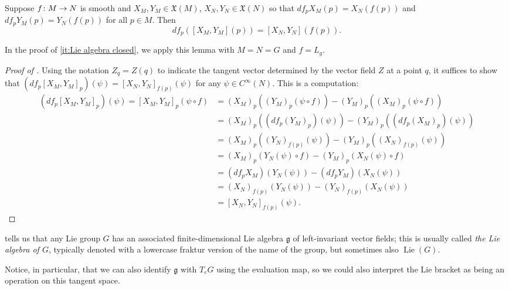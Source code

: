 \begin{lemma}\label{lem:differential of bracket}
	Suppose $f \colon\thinspace\! M \to N$ is smooth and $X_M, Y_M \in \mathfrak{X}(M)$, $X_N, Y_N \in \mathfrak{X}(N)$ so that $df_pX_M(p) = X_N(f(p))$ and $df_p Y_M(p) = Y_N(f(p))$ for all $p \in M$. Then
	\[
		df_p([X_M,Y_M](p)) = [X_N,Y_N](f(p)).
	\]
\end{lemma}

In the proof of  \ref{it:Lie algebra closed}, we apply this lemma with $M=N=G$ and $f = L_g$.

\begin{proof}[Proof of ]
	Using the notation $Z_q = Z(q)$ to indicate the tangent vector determined by the vector field $Z$ at a point $q$, it suffices to show that $\left(df_p[X_M,Y_M]_p\right)(\psi) = [X_N,Y_N]_{f(p)}(\psi)$ for any $\psi \in C^\infty(N)$. This is a computation:
	\begin{align*}
		\left(df_p[X_M,Y_M]_p\right)(\psi) = [X_M,Y_M]_p(\psi \circ f) & = (X_M)_p((Y_M)_p(\psi \circ f)) - (Y_M)_p((X_M)_p(\psi \circ f)) \\
		& = (X_M)_p((df_p (Y_M)_p)(\psi)) - (Y_M)_p((df_p (X_M)_p)(\psi)) \\
		& = (X_M)_p((Y_N)_{f(p)}(\psi)) - (Y_M)_p((X_N)_{f(p)}(\psi)) \\
		& = (X_M)_p(Y_N(\psi) \circ f) - (Y_M)_p(X_N(\psi) \circ f) \\
		& = (df_p X_M)(Y_N(\psi)) - (df_p Y_M)(X_N(\psi)) \\
		& = (X_N)_{f(p)}(Y_N(\psi)) - (Y_N)_{f(p)}(X_N(\psi)) \\
		& = [X_N,Y_N]_{f(p)}(\psi).
	\end{align*}
\end{proof}

 tells us that any Lie group $G$ has an associated finite-dimensional Lie algebra $\mathfrak{g}$ of left-invariant vector fields; this is usually called \emph{the Lie algebra of $G$}, typically denoted with a lowercase fraktur version of the name of the group, but sometimes also $\operatorname{Lie}(G)$.

Notice, in particular, that we can also identify $\mathfrak{g}$ with $T_eG$ using the evaluation map, so we could also interpret the Lie bracket as being an operation on this tangent space.

